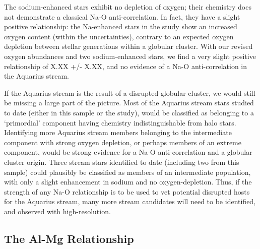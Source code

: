 \documentclass{emulateapj}
\begin{document}
The sodium-enhanced stars exhibit no depletion of oxygen; their chemistry does not demonstrate a classical Na-O anti-correlation. In fact, they have a slight positive relationship: the Na-enhanced stars in the \citet{wylie-de-boer;et-al_2012} study show an increased oxygen content (within the uncertainties), contrary to an expected oxygen depletion between stellar generations within a globular cluster. With our revised oxygen abundances and two sodium-enhanced stars, we find a very slight positive relationship of X.XX +/- X.XX, and no evidence of a Na-O anti-correlation in the Aquarius stream. 


If the Aquarius stream is the result of a disrupted globular cluster, we would still be missing a large part of the picture. Most of the Aquarius stream stars studied to date (either in this sample or the \citet{wylie-de-boer;et-al_2012} study), would be classified as belonging to a `primordial' component having chemistry indistinguishable from halo stars. Identifying more Aquarius stream members belonging to the intermediate component with strong oxygen depletion, or perhaps members of an extreme component, would be strong evidence for a Na-O anti-correlation and a globular cluster origin. Three stream stars identified to date (including two from this sample) could plausibly be classified as members of an intermediate population, with only a slight enhancement in sodium and no oxygen-depletion. Thus, if the strength of any Na-O relationship is to be used to vet potential disrupted hosts for the Aquarius stream, many more stream candidates will need to be identified, and observed with high-resolution.








\subsection{The Al-Mg Relationship}

\end{document}
